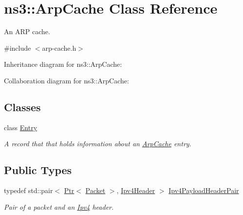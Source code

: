 \hypertarget{classns3_1_1ArpCache}{}\section{ns3\+:\+:Arp\+Cache Class Reference}
\label{classns3_1_1ArpCache}


An A\+RP cache.  




{\ttfamily \#include $<$arp-\/cache.\+h$>$}



Inheritance diagram for ns3\+:\+:Arp\+Cache\+:


Collaboration diagram for ns3\+:\+:Arp\+Cache\+:
\subsection*{Classes}
\begin{DoxyCompactItemize}
\item 
class \hyperlink{classns3_1_1ArpCache_1_1Entry}{Entry}
\begin{DoxyCompactList}\small\item\em A record that that holds information about an \hyperlink{classns3_1_1ArpCache}{Arp\+Cache} entry. \end{DoxyCompactList}\end{DoxyCompactItemize}
\subsection*{Public Types}
\begin{DoxyCompactItemize}
\item 
typedef std\+::pair$<$ \hyperlink{classns3_1_1Ptr}{Ptr}$<$ \hyperlink{classns3_1_1Packet}{Packet} $>$, \hyperlink{classns3_1_1Ipv4Header}{Ipv4\+Header} $>$ \hyperlink{classns3_1_1ArpCache_ad018741a53ccc6cdb8b05fdd4873ef3d}{Ipv4\+Payload\+Header\+Pair}
\begin{DoxyCompactList}\small\item\em Pair of a packet and an \hyperlink{classns3_1_1Ipv4}{Ipv4} header. \end{DoxyCompactList}\end{DoxyCompactItemize}
